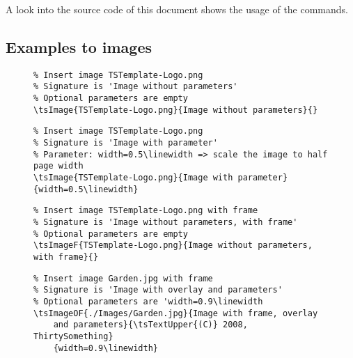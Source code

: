 A look into the source code of this document shows the usage of the commands.

\subsection{Examples to images}

\begin{figure}[H]
    \small
    \centering
    \begin{BVerbatim}
\tsImage{TSTemplate-Logo.png}{Image without parameters}{}
    \end{BVerbatim}
\end{figure}


\begin{figure}[H]
    \small
    \centering
    \begin{BVerbatim}
\tsImage{TSTemplate-Logo.png}{Image with parameter}{width=0.5\linewidth}
    \end{BVerbatim}
\end{figure}


\begin{figure}[H]
    \small
    \centering
    \begin{BVerbatim}
\tsImageF{TSTemplate-Logo.png}{Image without parameters, with frame}{}
    \end{BVerbatim}
\end{figure}


\begin{figure}[H]
    \small
    \centering
    \begin{BVerbatim}
\tsImageOF{./Images/Garden.jpg}{Image with frame, overlay
    and parameters}{\tsTextUpper{(C)} 2008, ThirtySomething}
    {width=0.9\linewidth}
    \end{BVerbatim}
\end{figure}

